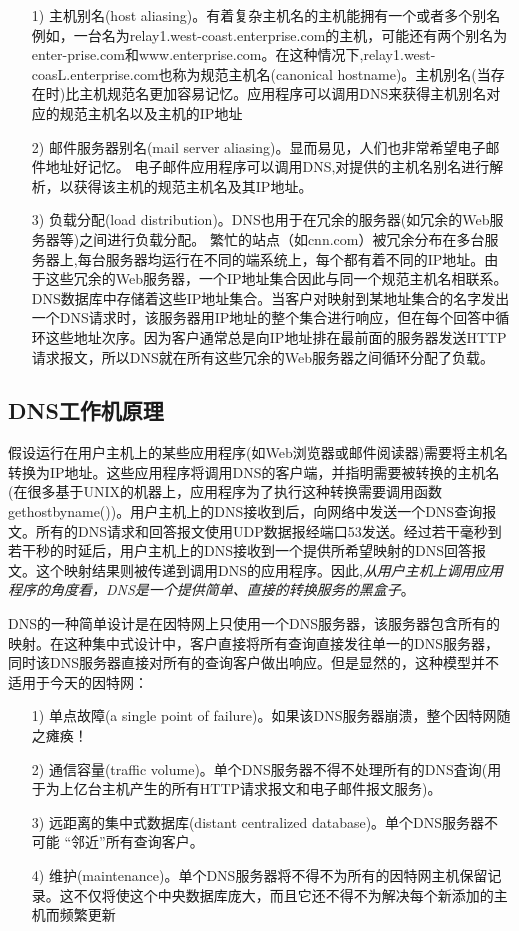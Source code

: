 \begin{itemize}
    \item [1)] 主机别名(host aliasing)。有着复杂主机名的主机能拥有一个或者多个别名
    \subitem 例如，一台名为relay1.west-coast.enterprise.com的主机，可能还有两个别名为enter-prise.com和www.enterprise.com。在这种情况下,relay1.west-coasL.enterprise.com也称为规范主机名(canonical hostname)。主机别名(当存在时)比主机规范名更加容易记忆。应用程序可以调用DNS来获得主机别名对应的规范主机名以及主机的IP地址
    \item [2)] 邮件服务器别名(mail server aliasing)。显而易见，人们也非常希望电子邮件地址好记忆。
    \subitem 电子邮件应用程序可以调用DNS,对提供的主机名别名进行解析，以获得该主机的规范主机名及其IP地址。
    \item [3)] 负载分配(load distribution)。DNS也用于在冗余的服务器(如冗余的Web服务器等)之间进行负载分配。
    \subitem 繁忙的站点（如cnn.com）被冗余分布在多台服务器上,每台服务器均运行在不同的端系统上，每个都有着不同的IP地址。由于这些冗余的Web服务器，一个IP地址集合因此与同一个规范主机名相联系。DNS数据库中存储着这些IP地址集合。当客户对映射到某地址集合的名字发出一个DNS请求时，该服务器用IP地址的整个集合进行响应，但在每个回答中循环这些地址次序。因为客户通常总是向IP地址排在最前面的服务器发送HTTP请求报文，所以DNS就在所有这些冗余的Web服务器之间循环分配了负载。
\end{itemize}

\subsection{DNS工作机原理}

    假设运行在用户主机上的某些应用程序(如Web浏览器或邮件阅读器)需要将主机名转换为IP地址。这些应用程序将调用DNS的客户端，并指明需要被转换的主机名(在很多基于UNIX的机器上，应用程序为了执行这种转换需要调用函数gethostbyname())。用户主机上的DNS接收到后，向网络中发送一个DNS查询报文。所有的DNS请求和回答报文使用UDP数据报经端口53发送。经过若干毫秒到若干秒的时延后，用户主机上的DNS接收到一个提供所希望映射的DNS回答报文。这个映射结果则被传递到调用DNS的应用程序。因此,\emph{从用户主机上调用应用程序的角度看，DNS是一个提供简单、直接的转换服务的黑盒子}。

    DNS的一种简单设计是在因特网上只使用一个DNS服务器，该服务器包含所有的映射。在这种集中式设计中，客户直接将所有查询直接发往单一的DNS服务器，同时该DNS服务器直接对所有的查询客户做出响应。但是显然的，这种模型并不适用于今天的因特网：

\begin{itemize}
    \item [1)] 单点故障(a single point of failure)。如果该DNS服务器崩溃，整个因特网随之瘫痪！
    \item [2)] 通信容量(traffic volume)。单个DNS服务器不得不处理所有的DNS査询(用于为上亿台主机产生的所有HTTP请求报文和电子邮件报文服务)。
    \item [3)] 远距离的集中式数据库(distant centralized database)。单个DNS服务器不可能 “邻近”所有查询客户。
    \item [4)] 维护(maintenance)。单个DNS服务器将不得不为所有的因特网主机保留记录。这不仅将使这个中央数据库庞大，而且它还不得不为解决每个新添加的主机而频繁更新
\end{itemize}

